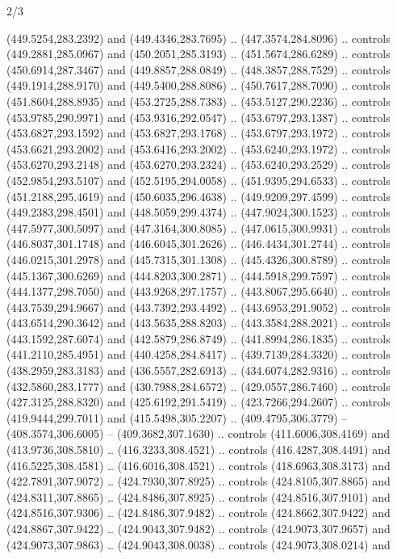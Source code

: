 \begin{flagdescription}{2/3}
\begin{scope}[xshift=0.5\flaglength,yshift=0.5\flagwidth,scale=\flagwidth/495.65]
\begin{scope}[y=0.8pt, x=0.8pt, yscale=-1,shift={(-463.76,-309.78)}]
  (449.5254,283.2392) and (449.4346,283.7695) .. (447.3574,284.8096) .. controls
  (449.2881,285.0967) and (450.2051,285.3193) .. (451.5674,286.6289) .. controls
  (450.6914,287.3467) and (449.8857,288.0849) .. (448.3857,288.7529) .. controls
  (449.1914,288.9170) and (449.5400,288.8086) .. (450.7617,288.7090) .. controls
  (451.8604,288.8935) and (453.2725,288.7383) .. (453.5127,290.2236) .. controls
  (453.9785,290.9971) and (453.9316,292.0547) .. (453.6797,293.1387) .. controls
  (453.6827,293.1592) and (453.6827,293.1768) .. (453.6797,293.1972) .. controls
  (453.6621,293.2002) and (453.6416,293.2002) .. (453.6240,293.1972) .. controls
  (453.6270,293.2148) and (453.6270,293.2324) .. (453.6240,293.2529) .. controls
  (452.9854,293.5107) and (452.5195,294.0058) .. (451.9395,294.6533) .. controls
  (451.2188,295.4619) and (450.6035,296.4638) .. (449.9209,297.4599) .. controls
  (449.2383,298.4501) and (448.5059,299.4374) .. (447.9024,300.1523) .. controls
  (447.5977,300.5097) and (447.3164,300.8085) .. (447.0615,300.9931) .. controls
  (446.8037,301.1748) and (446.6045,301.2626) .. (446.4434,301.2744) .. controls
  (446.0215,301.2978) and (445.7315,301.1308) .. (445.4326,300.8789) .. controls
  (445.1367,300.6269) and (444.8203,300.2871) .. (444.5918,299.7597) .. controls
  (444.1377,298.7050) and (443.9268,297.1757) .. (443.8067,295.6640) .. controls
  (443.7539,294.9667) and (443.7392,293.4492) .. (443.6953,291.9052) .. controls
  (443.6514,290.3642) and (443.5635,288.8203) .. (443.3584,288.2021) .. controls
  (443.1592,287.6074) and (442.5879,286.8749) .. (441.8994,286.1835) .. controls
  (441.2110,285.4951) and (440.4258,284.8417) .. (439.7139,284.3320) .. controls
  (438.2959,283.3183) and (436.5557,282.6913) .. (434.6074,282.9316) .. controls
  (432.5860,283.1777) and (430.7988,284.6572) .. (429.0557,286.7460) .. controls
  (427.3125,288.8320) and (425.6192,291.5419) .. (423.7266,294.2607) .. controls
  (419.9444,299.7011) and (415.5498,305.2207) .. (409.4795,306.3779) --
  (408.3574,306.6005) -- (409.3682,307.1630) .. controls (411.6006,308.4169) and
  (413.9736,308.5810) .. (416.3233,308.4521) .. controls (416.4287,308.4491) and
  (416.5225,308.4581) .. (416.6016,308.4521) .. controls (418.6963,308.3173) and
  (422.7891,307.9072) .. (424.7930,307.8925) .. controls (424.8105,307.8865) and
  (424.8311,307.8865) .. (424.8486,307.8925) .. controls (424.8516,307.9101) and
  (424.8516,307.9306) .. (424.8486,307.9482) .. controls (424.8662,307.9422) and
  (424.8867,307.9422) .. (424.9043,307.9482) .. controls (424.9073,307.9657) and
  (424.9073,307.9863) .. (424.9043,308.0038) .. controls (424.9073,308.0214) and

\end{scope}
\end{scope}
\end{flagdescription}
